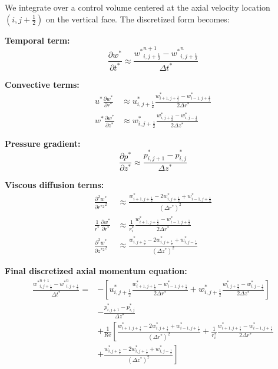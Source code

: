 \documentclass[12pt,a4paper]{article}
\newcommand{\parder}[2]{\frac{\partial #1}{\partial #2}}
\newcommand{\pparder}[2]{\frac{\partial^2 #1}{\partial {#2}^2}}
\newcommand{\Rey}{\text{Re}}
\begin{document}
We integrate over a control volume centered at the axial velocity location $(i, j+\frac{1}{2})$ on the vertical face. The discretized form becomes:

\textbf{Temporal term:}
\begin{equation}
    \parder{w^*}{t^*} \approx \frac{{w^*}_{i,j+\frac{1}{2}}^{n+1} - {w^*}_{i,j+\frac{1}{2}}^{n}}{\Delta t^*}
\end{equation}

\textbf{Convective terms:}
\begin{align}
    u^*\parder{w^*}{r^*} &\approx u^*_{i,j+\frac{1}{2}}\frac{w^*_{i+1,j+\frac{1}{2}} - w^*_{i-1,j+\frac{1}{2}}}{2\Delta r^*} \\
    w^*\parder{w^*}{z^*} &\approx w^*_{i,j+\frac{1}{2}}\frac{w^*_{i,j+\frac{3}{2}} - w^*_{i,j-\frac{1}{2}}}{2\Delta z^*}
\end{align}

\textbf{Pressure gradient:}
\begin{equation}
    \parder{p^*}{z^*} \approx \frac{p^*_{i,j+1} - p^*_{i,j}}{\Delta z^*}
\end{equation}

\textbf{Viscous diffusion terms:}
\begin{align}
    \pparder{w^*}{r^{*2}} &\approx \frac{w^*_{i+1,j+\frac{1}{2}} - 2w^*_{i,j+\frac{1}{2}} + w^*_{i-1,j+\frac{1}{2}}}{(\Delta r^*)^2} \\
    \frac{1}{r^*}\parder{w^*}{r^*} &\approx \frac{1}{r^*_{i}}\frac{w^*_{i+1,j+\frac{1}{2}} - w^*_{i-1,j+\frac{1}{2}}}{2\Delta r^*} \\
    \pparder{w^*}{z^{*2}} &\approx \frac{w^*_{i,j+\frac{3}{2}} - 2w^*_{i,j+\frac{1}{2}} + w^*_{i,j-\frac{1}{2}}}{(\Delta z^*)^2}
\end{align}

\textbf{Final discretized axial momentum equation:}
\begin{equation}
\boxed{
\begin{aligned}
    \frac{{w^*}_{i,j+\frac{1}{2}}^{n+1} - {w^*}_{i,j+\frac{1}{2}}^{n}}{\Delta t^*} = &-\left[u^*_{i,j+\frac{1}{2}}\frac{w^*_{i+1,j+\frac{1}{2}} - w^*_{i-1,j+\frac{1}{2}}}{2\Delta r^*} + w^*_{i,j+\frac{1}{2}}\frac{w^*_{i,j+\frac{3}{2}} - w^*_{i,j-\frac{1}{2}}}{2\Delta z^*}\right] \\
    &- \frac{p^*_{i,j+1} - p^*_{i,j}}{\Delta z^*} \\
    &+ \frac{1}{\Rey}\left[\frac{w^*_{i+1,j+\frac{1}{2}} - 2w^*_{i,j+\frac{1}{2}} + w^*_{i-1,j+\frac{1}{2}}}{(\Delta r^*)^2} + \frac{1}{r^*_{i}}\frac{w^*_{i+1,j+\frac{1}{2}} - w^*_{i-1,j+\frac{1}{2}}}{2\Delta r^*}\right. \\
    &\left.+ \frac{w^*_{i,j+\frac{3}{2}} - 2w^*_{i,j+\frac{1}{2}} + w^*_{i,j-\frac{1}{2}}}{(\Delta z^*)^2}\right]
\end{aligned}
}
\end{equation}
\end{document}
